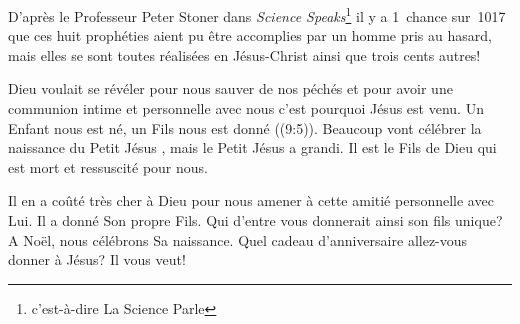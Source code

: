 D'après le Professeur Peter Stoner dans \emph{Science Speaks}\footnote{c'est-à-dire \og La Science Parle \fg{}} il y a 1~chan\-ce sur~1017 que ces huit prophéties aient pu être accomplies par un homme pris au hasard, mais elles se sont toutes réalisées en Jésus-Christ ainsi que trois cents autres!

Dieu voulait se révéler pour nous sauver de nos péchés et pour avoir une communion intime et personnelle avec nous \ocadr c'est pourquoi Jésus est venu. \og Un Enfant nous est né, un Fils nous est donné \fg{} ((9:5)). Beaucoup vont célébrer la naissance du \og Petit Jésus \fg{}, mais le \og Petit Jésus \fg{} a grandi. Il est le Fils de Dieu qui est mort et ressuscité pour nous.

Il en a coûté très cher à Dieu pour nous amener à cette amitié personnelle avec Lui. Il a donné Son propre Fils. Qui d'entre vous donnerait ainsi son fils unique? A Noël, nous célébrons Sa naissance. Quel cadeau d'anniversaire allez-vous donner à Jésus? Il vous veut!


